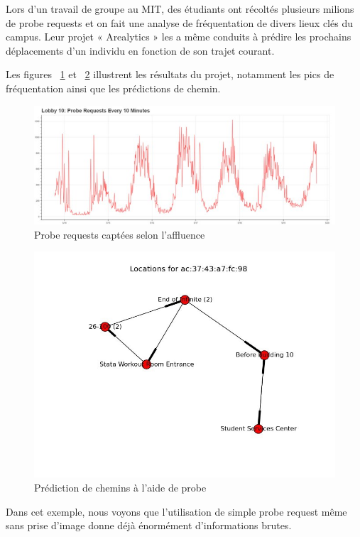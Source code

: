 Lors d’un travail de groupe au MIT\cite{MITPROBE}, des étudiants ont récoltés plusieurs milions de probe requests et on fait une
analyse de fréquentation de divers lieux clés du campus. Leur projet « Arealytics » les a même conduits à prédire
les prochains déplacements d’un individu en fonction de son trajet courant.

Les figures ~\ref{fig:arealytics-graph} et ~\ref{fig:arealytics-path} illustrent les résultats du projet, notamment les pics de fréquentation
ainsi que les prédictions de chemin.
\begin{figure}[H]
	\centering
	\includegraphics[width=16cm]{images/etude-legi-1.jpg}
	\caption{Probe requests captées selon l'affluence}
	\label{fig:arealytics-graph}
\end{figure}
\begin{figure}[H]
	\centering
	\includegraphics[width=12cm]{images/etude-legi-2.jpg}
	\caption{Prédiction de chemins à l'aide de probe}
	\label{fig:arealytics-path}
\end{figure}

Dans cet exemple, nous voyons que l’utilisation de simple probe request même sans prise d’image donne déjà
énormément d’informations brutes.

